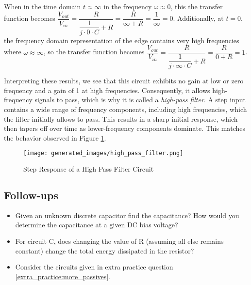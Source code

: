\documentclass[main.tex]{subfiles}
\begin{document}
\newnoindentpara When in the time domain $t \approx \infty$ in the frequency $\omega \approx 0$, this the transfer function becomes $\dfrac{V_{out}}{V_{in}} = \dfrac{R}{\dfrac{1}{j \cdot 0 \cdot C} + R} = \dfrac{R}{\infty + R} = \dfrac{1}{\infty} = 0$. Additionally, at $t = 0$, the frequency domain representation of the edge contains very high frequencies where $\omega \approx \infty$, so the transfer function becomes $\dfrac{V_{out}}{V_{in}} = \dfrac{R}{\dfrac{1}{j \cdot \infty \cdot C} + R} = \dfrac{R}{0 + R} = 1$. \newline
\newline

\newnoindentpara Interpreting these results, we see that this circuit exhibits no gain at low or zero frequency and a gain of 1 at high frequencies. Consequently, it allows high-frequency signals to pass, which is why it is called a \textit{high-pass filter}. A step input contains a wide range of frequency components, including high frequencies, which the filter initially allows to pass. This results in a sharp initial response, which then tapers off over time as lower-frequency components dominate. This matches the behavior observed in Figure \ref{fig:step-response-high-pass-filter}.

\begin{figure}[H]
    \centering
    \texttt{[image: generated\_images/high\_pass\_filter.png]}
    \caption{Step Response of a High Pass Filter Circuit}
    \label{fig:step-response-high-pass-filter}
\end{figure}


\subsection{Follow-ups}
\begin{itemize}
    \item Given an unknown discrete capacitor find the capacitance? How would you determine the capacitance at a given DC bias voltage? %
    \item For circuit C, does changing the value of R (assuming all else remains constant) change the total energy dissipated in the resistor? %
    \item Consider the circuits given in extra practice question \ref{extra_practice:more_passives}. %
\end{itemize}
\end{document}

